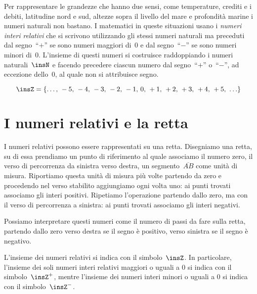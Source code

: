 Per rappresentare le grandezze che hanno due sensi, come temperature, crediti e i debiti, latitudine nord e sud,
altezze sopra il livello del mare e profondità marine i numeri naturali non bastano. I matematici in queste
situazioni usano i \emph{numeri interi relativi} che si scrivono utilizzando gli stessi numeri naturali ma preceduti
dal segno~``$+$'' se sono numeri maggiori di~0 e dal segno~``$-$'' se sono numeri minori di~0. L'insieme di questi numeri
si costruisce raddoppiando i numeri naturali~$\insN$ e facendo precedere ciascun numero dal segno~``$+$'' o~``$-$'',
ad eccezione dello~0, al quale non si attribuisce segno.

\[ \insZ=\lbrace\ldots\text{,~}-5\text{,~}-4\text{,~}-3\text{,~}-2\text{,~}-1\text{,~}0\text{,~}+1\text{,~}+2\text{,~}+3\text{,~}+4\text{,~}+5\text{,~}\ldots\rbrace \]
\pagebreak

\section{I numeri relativi e la retta}

I numeri relativi possono essere rappresentati su una retta. Disegniamo una retta, su di essa prendiamo
un punto di riferimento al quale associamo il numero zero, il verso di percorrenza da sinistra verso destra,
un segmento~$\overline{AB}$ come unità di misura. Riportiamo questa unità di misura più volte partendo da zero e
procedendo nel verso stabilito aggiungiamo ogni volta uno: ai punti trovati associamo gli interi positivi.
Ripetiamo l'operazione partendo dallo zero, ma con il verso di percorrenza a sinistra: ai punti trovati associamo
gli interi negativi.

\begin{center}
 
\end{center}

Possiamo interpretare questi numeri come il numero di passi da fare sulla retta, partendo dallo zero verso
destra se il segno è positivo, verso sinistra se il segno è negativo.

L'insieme dei numeri relativi si indica con il simbolo~$\insZ$. In particolare, l'insieme dei soli numeri interi relativi maggiori o uguali a 0
si indica con il simbolo~$\insZ^+$, mentre 
l'insieme dei numeri interi minori o uguali a 0 si indica con il simbolo~$\insZ^-$.%

